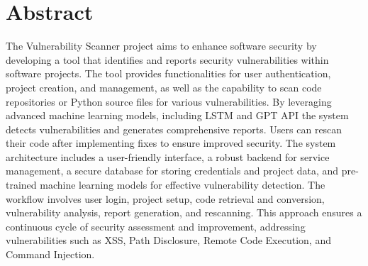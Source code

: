 \chapter*{Abstract}
The Vulnerability Scanner project aims to enhance software security by developing a tool that identifies and reports security vulnerabilities within software projects. 
The tool provides functionalities for user authentication, project creation, and management, as well as the capability to scan code repositories or Python source files for various vulnerabilities. 
By leveraging advanced machine learning models, including LSTM and GPT API the system detects vulnerabilities and generates comprehensive reports. 
Users can rescan their code after implementing fixes to ensure improved security. 
The system architecture includes a user-friendly interface, a robust backend for service management, a secure database for storing credentials and project data, and pre-trained machine learning models for effective vulnerability detection. 
The workflow involves user login, project setup, code retrieval and conversion, vulnerability analysis, report generation, and rescanning. 
This approach ensures a continuous cycle of security assessment and improvement, addressing vulnerabilities such as XSS, Path Disclosure, Remote Code Execution, and Command Injection.